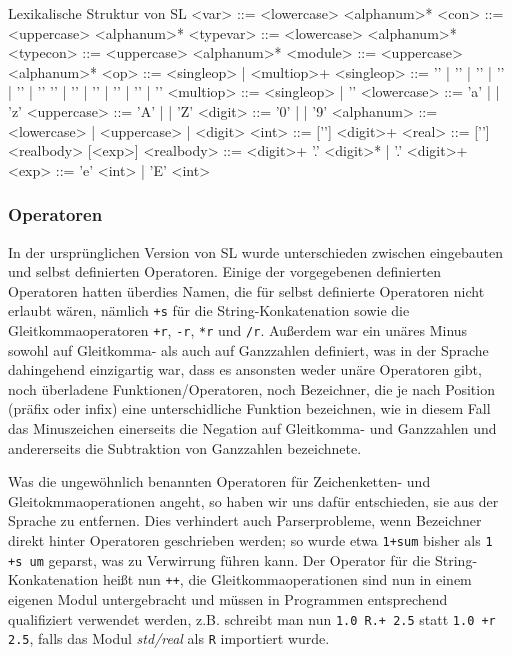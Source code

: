 \documentclass[runningheads]{llncs}
\begin{document}
\begin{grammarfigure}{Lexikalische Struktur von SL}
<var>       ::= <lowercase> <alphanum>*
<con>       ::= <uppercase> <alphanum>*
<typevar>   ::= <lowercase> <alphanum>*
<typecon>   ::= <uppercase> <alphanum>*
<module>    ::= <uppercase> <alphanum>*
<op>        ::= <singleop> | <multiop>+
<singleop>  ::= '\exclamationOp' | '\paragraphOp' | '\percentOp' | '\ampOp' | '\divint' | '\questionOp' 
           \alt '\addint' | '\mulint' | '\sharpOp' | '\subint' | '\ltint' | '\gtint'
<multiop>   ::= <singleop> | '\eq'
<lowercase> ::= 'a' | \cdots | 'z'
<uppercase> ::= 'A' | \cdots | 'Z'
<digit>     ::= '0' | \cdots | '9'
<alphanum>  ::= <lowercase> | <uppercase> | <digit>
<int>       ::= ['\subint'] <digit>+
<real>      ::= ['\subint'] <realbody> [<exp>]
<realbody>  ::= <digit>+ '.' <digit>* | '.' <digit>+
<exp>       ::= 'e' <int> | 'E' <int>
\end{grammarfigure}

\subsubsection{Operatoren}

In der ursprünglichen Version von SL wurde unterschieden zwischen
eingebauten und selbst definierten Operatoren. Einige der vorgegebenen
definierten Operatoren hatten überdies Namen, die für selbst
definierte Operatoren nicht erlaubt wären, nämlich \verb|+s| für die
String-Konkatenation sowie die Gleitkommaoperatoren \verb|+r|,
\verb|-r|, \verb|*r| und \verb|/r|. Außerdem war ein unäres Minus
sowohl auf Gleitkomma- als auch auf Ganzzahlen definiert, was in der
Sprache dahingehend einzigartig war, dass es ansonsten weder unäre
Operatoren gibt, noch überladene Funktionen/Operatoren, noch
Bezeichner, die je nach Position (präfix oder infix) eine
unterschidliche Funktion bezeichnen, wie in diesem Fall das
Minuszeichen einerseits die Negation auf Gleitkomma- und Ganzzahlen
und andererseits die Subtraktion von Ganzzahlen bezeichnete.


Was die ungewöhnlich benannten Operatoren für Zeichenketten- und
Gleitokmmaoperationen angeht, so haben wir uns dafür entschieden, sie
aus der Sprache zu entfernen.  Dies verhindert auch Parserprobleme,
wenn Bezeichner direkt hinter Operatoren geschrieben werden; so wurde
etwa \verb|1+sum| bisher als \verb|1 +s um| geparst, was zu Verwirrung
führen kann.  Der Operator für die String-Konkatenation heißt nun
\verb|++|, die Gleitkommaoperationen sind nun in einem eigenen Modul
untergebracht und müssen in Programmen entsprechend qualifiziert
verwendet werden, z.B. schreibt man nun \verb|1.0 R.+ 2.5| statt
\verb|1.0 +r 2.5|, falls das Modul \emph{std/real} als \verb|R|
importiert wurde.
\end{document}
